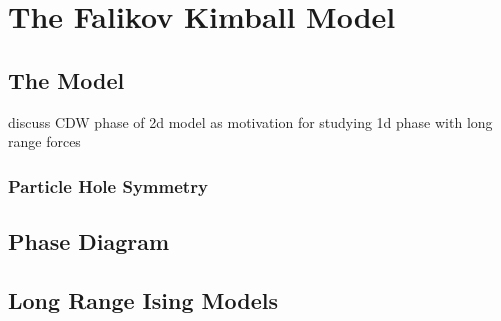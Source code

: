 \begin{Shaded}
\begin{Highlighting}[]
\OperatorTok{\%\%}
\end{Highlighting}
\end{Shaded}

\hypertarget{the-falikov-kimball-model}{%
\section{The Falikov Kimball Model}\label{the-falikov-kimball-model}}

\hypertarget{the-model}{%
\subsection{The Model}\label{the-model}}

discuss CDW phase of 2d model as motivation for studying 1d phase with long range forces

\hypertarget{particle-hole-symmetry}{%
\subsubsection{Particle Hole Symmetry}\label{particle-hole-symmetry}}

\hypertarget{phase-diagram}{%
\subsection{Phase Diagram}\label{phase-diagram}}

\hypertarget{long-range-ising-models}{%
\subsection{Long Range Ising Models}\label{long-range-ising-models}}

\begin{Shaded}
\begin{Highlighting}[]

\end{Highlighting}
\end{Shaded}
